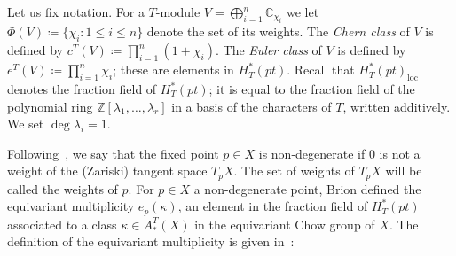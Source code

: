 \documentclass[11pt]{article}
\theoremstyle{definition}
\numberwithin{equation}{section}
\newcommand{\C}{{\mathbb C}}
\DeclareMathOperator{\loc}{loc}
\begin{document}
Let us fix notation. For a $T$-module $V = \bigoplus_{i=1}^n \C_{\chi_i}$ we let \mbox{$\Phi(V) \coloneqq \{ \chi_i : 1 \le i \le n\}$} denote the set of its weights. The {\em Chern class} of $V$ is defined by $c^T(V) \coloneqq  \prod_{i=1}^n (1+ \chi_i)$. 
The {\em Euler class} of $V$ is defined by $e^T(V) \coloneqq  \prod_{i=1}^n \chi_i$; these 
are elements in $H^*_T(pt)$. Recall that $H^*_T(pt)_{\loc} $ 
denotes the fraction field of $H^*_T(pt)$; it is equal to the fraction field 
	of the polynomial ring $\mathbb{Z}[\lambda_1, \ldots , \lambda_r]$ in a basis of the characters 
	of $T$, written additively. We set $\deg \lambda_i =1$.


Following~\cite[\S 4]{brion:eq-chow}, we say that the fixed point $p \in X$ is non-degenerate if $0$ is not a weight
of the (Zariski) tangent space $T_p X$. The set of weights of $T_p X$ will be called the weights of $p$. 
For $p \in X$ a non-degenerate point, Brion defined
	the equivariant 
	multiplicity $e_p(\kappa)$, an element in the fraction field of $H^*_T(pt)$ associated 
	to a class $\kappa \in A_*^T(X)$ in the equivariant Chow group of $X$.
The definition of the equivariant multiplicity is given in~\cite[\S 4.2]{brion:eq-chow}:
\end{document}
